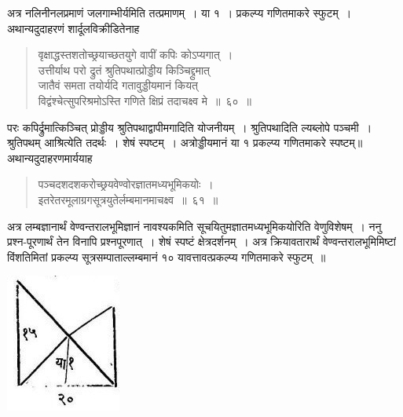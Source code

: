 \documentclass[11pt, openany]{book}
\begin{document}
अत्र नलिनीनलप्रमाणं जलगाम्भीर्यमिति तत्प्रमाणम्~। या १~। प्रकल्प्य 
गणितमाकरे स्फुटम्~। अथान्यदुदाहरणं शार्दूलविक्रीडितेनाह\textendash 
\begin{quote}
    \ex
    वृक्षाद्धस्तशतोच्छ्रयाच्छतयुगे वापीं कपिः कोऽप्यगात्~। \\
 उत्तीर्याथ परो द्रुतं श्रुतिपथात्प्रोड्डीय किञ्चिद्द्रुमात् \\
 जातैवं समता तयोर्यदि गतावुड्डीयमानं कियत् \\
 विद्वंश्चेत्सुपरिश्रमोऽस्ति गणिते क्षिप्रं तदाचक्ष्व मे~॥~६०~॥
\end{quote}
\newpage 

परः कपिर्द्रुमात्किञ्चित् प्रोड्डीय श्रुतिपथाद्वापीमगादिति योजनीयम्~। श्रुतिपथादिति 
ल्यब्लोपे पञ्चमी~। श्रुतिपथम् आश्रित्येति तदर्थः~। शेषं स्पष्टम्~। अत्रोड्डीयमानं 
या १ प्रकल्प्य गणितमाकरे स्पष्टम्॥ \\

\vspace{-3mm}
 अथान्यदुदाहरणमार्ययाह\textendash 
\begin{quote}
    \ex
    पञ्चदशदशकरोच्छ्रयवेण्वोरज्ञातमध्यभूमिकयोः~। \\
 इतरेतरमूलाग्रगसूत्रयुतेर्लम्बमानमाचक्ष्व~॥~६१~॥~
\end{quote}
 
\begin{flushleft}
\begin{minipage}[c]{0.65\textwidth}
\hspace{4mm} अत्र लम्बज्ञानार्थं वेण्वन्तरालभूमिज्ञानं नावश्यकमिति सूचयितुमज्ञातमध्यभूमिकयोरिति वेणुविशेषम्~। ननु प्रश्न-पूरणार्थं तेन विनापि प्रश्नपूरणात्~। शेषं स्पष्टं क्षेत्रदर्शनम्~। अत्र क्रियावतारार्थं वेण्वन्तरालभूमिमिष्टां विंशतिमितां प्रकल्प्य सूत्रसम्पाताल्लम्बमानं १० यावत्तावत्प्रकल्प्य गणितमाकरे स्फुटम्~॥ 
\end{minipage} 
\hfill
\begin{minipage}{0.3\textwidth} 
\hspace{2mm} \includegraphics[scale=0.5]{Graphics/Capture4.JPG}
\end{minipage} 
\end{flushleft}
\end{document}
